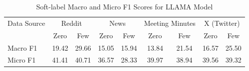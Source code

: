 \begin{table}[htbp]
\centering
\begin{tabular}{l *{8}{c}}
\toprule
Data Source & \multicolumn{2}{c}{Reddit} & \multicolumn{2}{c}{News} & \multicolumn{2}{c}{Meeting Minutes} & \multicolumn{2}{c}{X (Twitter)} \\
& Zero & Few & Zero & Few & Zero & Few & Zero & Few \\
\midrule
Macro F1 & 19.42 & 29.66 & 15.05 & 15.94 & 13.84 & 21.54 & 16.57 & 25.50 \\
Micro F1 & 41.41 & 40.71 & 36.57 & 28.33 & 39.97 & 38.94 & 39.56 & 39.32 \\
\bottomrule
\end{tabular}
\centering\caption{Soft-label Macro and Micro F1 Scores for LLAMA Model}
\label{tab:llama_macro_micro}
\end{table}